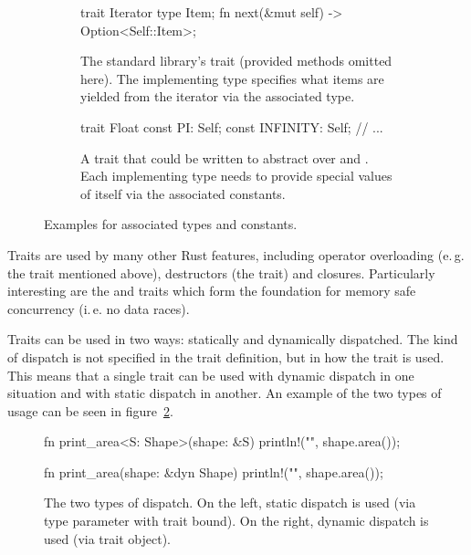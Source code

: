 \begin{figure}[b]
  \centering
    \begin{subfigure}[t]{.47\textwidth}
    \begin{rustcode}
      trait Iterator {
          type Item;
          fn next(&mut self)
              -> Option<Self::Item>;
      }
    \end{rustcode}
    \caption{
      The standard library's  trait (provided methods omitted here).
      The implementing type specifies what items are yielded from the iterator via the associated type.
    }
  \end{subfigure}
  \hspace{.04\textwidth}
  \begin{subfigure}[t]{.47\textwidth}
    \begin{rustcode}
      trait Float {
          const PI: Self;
          const INFINITY: Self;
          // ...
      }
    \end{rustcode}
    \caption{
      A trait that could be written to abstract over  and .
      Each implementing type needs to provide special values of itself via the associated constants.
    }
  \end{subfigure}
  \caption{
    Examples for associated types and constants.
  }
  \label{fig:associated-type-const}
\end{figure}



Traits are used by many other Rust features, including operator overloading (e.\,g. the  trait mentioned above), destructors (the  trait) and closures.
Particularly interesting are the  and  traits which form the foundation for memory safe concurrency (i.\,e. no data races).

Traits can be used in two ways: statically and dynamically dispatched.
The kind of dispatch is not specified in the trait definition, but in how the trait is used.
This means that a single trait can be used with dynamic dispatch in one situation and with static dispatch in another.
An example of the two types of usage can be seen in figure~\ref{fig:dispatch}.

\begin{figure}[t]
  \centering
    \begin{minipage}[t]{.49\textwidth}
    \begin{rustcode}
      fn print_area<S: Shape>(shape: &S) {
          println!("{}", shape.area());
      }
    \end{rustcode}
  \end{minipage}
  \begin{minipage}[t]{.49\textwidth}
    \begin{rustcode}
      fn print_area(shape: &dyn Shape) {
          println!("{}", shape.area());
      }
    \end{rustcode}
  \end{minipage}
  \caption{
    The two types of dispatch.
    On the left, static dispatch is used (via type parameter with trait bound).
    On the right, dynamic dispatch is used (via trait object).
  }
  \label{fig:dispatch}
\end{figure}

